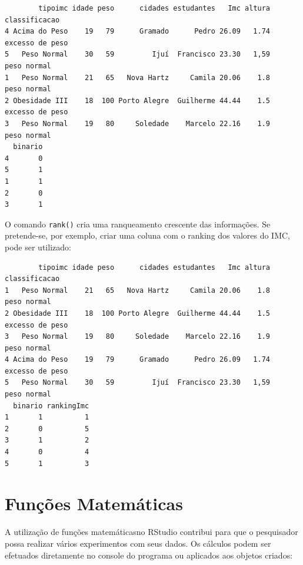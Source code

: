 \documentclass[12pt,brazil,oneside]{book}
\newenvironment{Shaded}{\begin{snugshade}}{\end{snugshade}}
\newcommand{\KeywordTok}[1]{\textcolor[rgb]{0.13,0.29,0.53}{\textbf{#1}}}
\newcommand{\NormalTok}[1]{#1}
\newcommand{\OperatorTok}[1]{\textcolor[rgb]{0.81,0.36,0.00}{\textbf{#1}}}
\begin{document}
\begin{verbatim}
        tipoimc idade peso      cidades estudantes   Imc altura   classificacao
4 Acima do Peso    19   79      Gramado      Pedro 26.09   1.74 excesso de peso
5   Peso Normal    30   59         Ijuí  Francisco 23.30   1,59     peso normal
1   Peso Normal    21   65   Nova Hartz     Camila 20.06    1.8     peso normal
2 Obesidade III    18  100 Porto Alegre  Guilherme 44.44    1.5 excesso de peso
3   Peso Normal    19   80     Soledade    Marcelo 22.16    1.9     peso normal
  binario
4       0
5       1
1       1
2       0
3       1
\end{verbatim}

O comando \texttt{rank()} cria uma ranqueamento crescente das
informações. Se pretende-se, por exemplo, criar uma coluna com o ranking
dos valores do IMC, pode ser utilizado:

\begin{Shaded}
\end{Shaded}

\begin{verbatim}
        tipoimc idade peso      cidades estudantes   Imc altura   classificacao
1   Peso Normal    21   65   Nova Hartz     Camila 20.06    1.8     peso normal
2 Obesidade III    18  100 Porto Alegre  Guilherme 44.44    1.5 excesso de peso
3   Peso Normal    19   80     Soledade    Marcelo 22.16    1.9     peso normal
4 Acima do Peso    19   79      Gramado      Pedro 26.09   1.74 excesso de peso
5   Peso Normal    30   59         Ijuí  Francisco 23.30   1,59     peso normal
  binario rankingImc
1       1          1
2       0          5
3       1          2
4       0          4
5       1          3
\end{verbatim}

\hypertarget{funcoes-matematicas}{%
\section{Funções Matemáticas}\label{funcoes-matematicas}}

A utilização de funções matemáticasno RStudio contribui para que o
pesquisador possa realizar vários experimentos com seus dados. Os
cálculos podem ser efetuados diretamente no console do programa ou
aplicados aos objetos criados:
\end{document}
